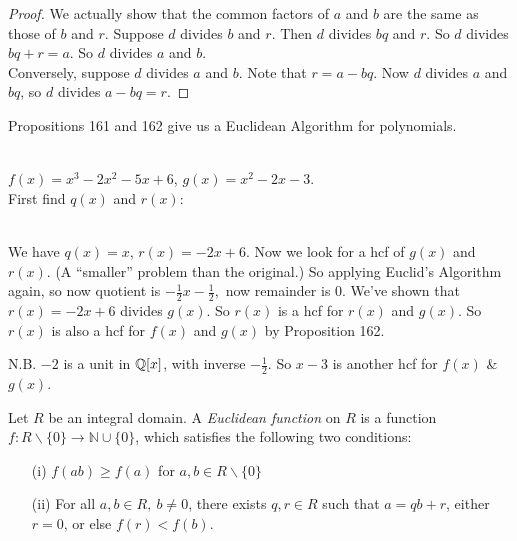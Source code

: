 \documentclass[10pt]{scrartcl}
\begin{document}
\begin{proof}
We actually show that the common factors of $a$ and $b$ are the same as those of $b$ and $r$. Suppose $d$ divides $b$ and $r$. Then $d$ divides $bq$ and $r$. So $d$ divides $bq + r = a$. So $d$ divides $a$ and $b$.\\
Conversely, suppose $d$ divides $a$ and $b$. Note that $r = a - bq$. Now $d$ divides $a$ and $bq$, so $d$ divides $a - bq = r$.	
\end{proof}\vspace*{5pt}

 Propositions 161 and 162 give us a Euclidean Algorithm for polynomials. \\

\begin{example} \\$f(x) = x^3 - 2x^2 -5x + 6$, $g(x) = x^2 - 2x -3$.\\
First find $q(x)$ and $r(x)$:\\
~

 We have $q(x) = x$, $r(x) = -2x + 6$. Now we look for a hcf of $g(x)$ and $r(x).$ (A ``smaller'' problem than the original.) So applying Euclid's Algorithm again, so now quotient is $-\frac{1}{2}x - \frac{1}{2} ,$ now remainder is $0$. We've shown that $r(x) = -2x + 6$ divides $g(x)$. So $r(x)$ is a hcf for $r(x)$ and $g(x)$. So $r(x)$ is also a hcf for $f(x)$ and $g(x)$ by Proposition 162.

N.B. $-2$ is a unit in $\mathbb{Q}[x]$, with inverse $-\frac{1}{2}$. So $x-3$ is another hcf for $f(x)$ \& $g(x)$.
\end{example}



\begin{definition} Let  
 $R$ be an integral domain. A \emph{Euclidean function} on $R$ is a function $f: R\backslash\{0\} \to \mathbb{N} \cup \{0\}$, which satisfies the following two conditions: \begin{enumerate}
 \item[(i)] $f(ab) \geq f(a)$ for $a,b \in R\backslash\{0\}$
 \item[(ii)] For all $a,b \in R,~b \neq 0$, there exists $q,r \in R$ such that $a = qb + r$, either $r = 0$, or else $f(r) < f(b)$.	
 \end{enumerate}\end{definition}
\end{document}
